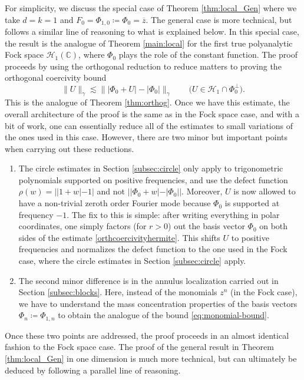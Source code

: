 \documentclass[11pt]{amsart}
\theoremstyle{remark}
\newcommand{\abs}[1]{\lvert #1 \rvert}
\newcommand{\norm}[1]{\lVert #1 \rVert}
\begin{document}
For simplicity, we discuss the special case of Theorem \ref{thm:local_Gen} where we take $d=k=1$ and $F_0=\Phi_{1,0}\coloneq \Phi_0=\overline{z}$. The general case is more technical, but follows a similar line of reasoning to what is explained below. In this special case, the result is the analogue of Theorem \ref{main:local} for the first true polyanalytic Fock space $\mathcal{H}_1(\mathbb{C})$, where $\Phi_0$ plays the role of the constant function. The proof proceeds by using the orthogonal reduction to reduce matters to proving the orthogonal coercivity bound %
\begin{equation}\label{orthcoercivityhermite}
\norm{U}_\gamma
\lesssim
\norm{\abs{\Phi_0 + U} - \abs{\Phi_0}}_\gamma
\qquad
\bigl(U \in \mathcal{H}_1 \cap \Phi_0^\perp\bigr).
\end{equation}
This is the analogue of Theorem \ref{thm:orthog}. Once we have this estimate, the overall architecture of the proof is the same as in the Fock space case, and with a bit of work, one can essentially reduce all of the estimates to small variations of the ones used in this case. However, there are two minor but important points when carrying out these reductions.
\begin{enumerate}
\item The circle estimates in Section \ref{subsec:circle} only apply to trigonometric polynomials supported on positive frequencies, and use the defect function $\rho(w)=||1+w|-1|$ and not $||\Phi_0+w|-|\Phi_0||$. Moreover, $U$ is now allowed to have a non-trivial zeroth order Fourier mode because $\Phi_0$ is supported at frequency $-1$. The fix to this is simple: after writing everything in polar coordinates, one simply factors (for $r>0$) out the basis vector $\Phi_0$ on both sides of the estimate \eqref{orthcoercivityhermite}. This shifts $U$ to positive frequencies and normalizes the defect function to the one used in the Fock case, where the circle estimates in Section \ref{subsec:circle} apply.
\item The second minor difference is in the annulus localization carried out in Section \ref{subsec:blocks}. Here, instead of the monomials $z^n$ (in the Fock case), we have to understand the mass concentration properties of the basis vectors $\Phi_n\coloneq \Phi_{1,n}$ to obtain the analogue of the bound \eqref{eq:monomial-bound}.
\end{enumerate}
Once these two points are addressed, the proof proceeds in an almost identical fashion to the Fock space case. The proof of the general result in Theorem \ref{thm:local_Gen} in one dimension is much more technical, but can ultimately be deduced by following a parallel line of reasoning. %
\end{document}
